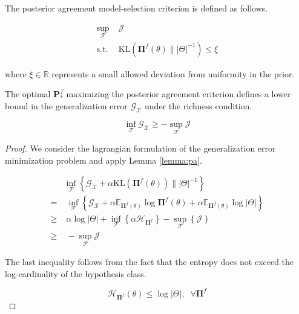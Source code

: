\begin{definition}\label{def:pa}
    The posterior agreement model-selection criterion is defined as follows.

    $$
    \begin{aligned}
        \sup_{\mathcal{F}} & \; \mathcal{J} \\
        \text{s.t.} & \; \text{KL}(\mathbf{\Pi}^f(\theta) \parallel |\Theta|^{-1}) \leq \xi
    \end{aligned}
    $$
    
    where $\xi \in \mathbb{R}$ represents a small allowed deviation from uniformity in the prior.
\end{definition}

\begin{theorem}
The optimal $\mathbf{P}_{*}^f$ maximizing the posterior agreement criterion defines a lower bound
in the generalization error $\mathcal{G}_{\mathcal{X}}$ under the richness condition.

$$
    \inf_{\mathcal{F}} \mathcal{G}_{\mathcal{X}} \geq -\sup_{\mathcal{F}} \mathcal{J}
$$
\end{theorem}

\begin{proof}
    We consider the lagrangian formulation of the generalization error minimization problem 
    and apply Lemma \ref{lemma:pa}.

    $$
    \begin{aligned}
        & \inf_{\mathcal{F}} \left \{ \mathcal{G}_{\mathcal{X}} + \alpha \text{KL} (\mathbf{\Pi}^f(\theta)) \parallel |\Theta|^{-1} \right \} \\
        = & \; \inf_{\mathcal{F}} \left \{ \mathcal{G}_{\mathcal{X}} + \alpha \mathbb{E}_{\mathbf{\Pi}^f(\theta)} \log \mathbf{\Pi}^f(\theta) + \alpha \mathbb{E}_{\mathbf{\Pi}^f(\theta)} \log |\Theta| \right \} \\
        \geq & \; \alpha \log |\Theta| + \inf_{\mathcal{F}} \left \{ \alpha \mathcal{H}_{\mathbf{\Pi}^f} \right \} - \sup_{\mathcal{F}} \left \{ \mathcal{J} \right \} \\
        \geq & \; - \sup_{\mathcal{F}} \mathcal{J}
    \end{aligned}
    $$

    The last inequality follows from the fact that the entropy does not exceed the log-cardinality
    of the hypothesis class.

    $$
    \mathcal{H}_{\mathbf{\Pi}^f}(\theta) \leq \log |\Theta|, \;\; \forall \mathbf{\Pi}^f
    $$
\end{proof}





